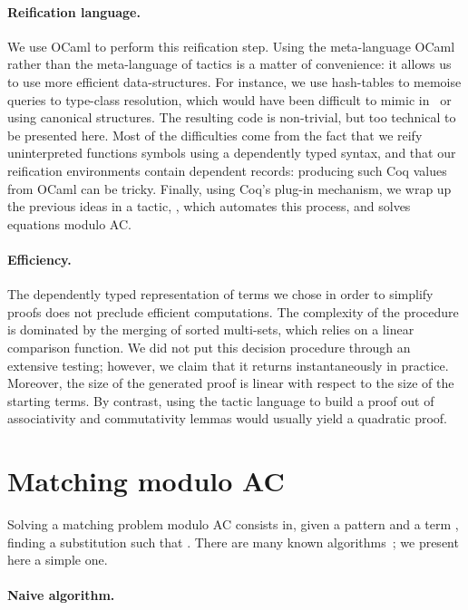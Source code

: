 \documentclass{llncs}
\begin{document}
\paragraph{Reification language.} 

We use OCaml to perform this reification step. Using the meta-language
OCaml rather than the meta-language of tactics \ltac{} is a matter of
convenience: it allows us to use more efficient data-structures. For
instance, we use hash-tables to memoise queries to type-class
resolution, which would have been difficult to mimic in \ltac\ or
using canonical structures. 
The resulting code is non-trivial, but too technical to be presented
here. Most of the difficulties come from the fact that we reify
uninterpreted functions symbols using a dependently typed syntax, and
that our reification environments contain dependent records: producing
such Coq values from OCaml can be tricky.
Finally, using Coq's plug-in mechanism, we wrap up the previous ideas
in a tactic, \tac, which automates this process, and solves equations
modulo AC.

\paragraph{Efficiency.} 

The dependently typed representation of terms we chose in order to
simplify proofs does not preclude efficient computations.
The complexity of the procedure is dominated by the merging of sorted
multi-sets, which relies on a linear comparison function.
We did not put this decision procedure through an extensive testing;
however, we claim that it returns instantaneously in practice.
Moreover, the size of the generated proof is linear with respect to
the size of the starting terms. By contrast, using the tactic language
to build a proof out of associativity and commutativity lemmas would
usually yield a quadratic proof.


\section{Matching modulo AC}
\label{sec:matching}

Solving a matching problem modulo AC consists in, given a pattern 
and a term , finding a substitution  such that .  There are many known
algorithms~\cite{contejean-04,eker-02,hullot,nipkow-90}; we present
here a simple one.

\paragraph{Naive algorithm.}
\end{document}
